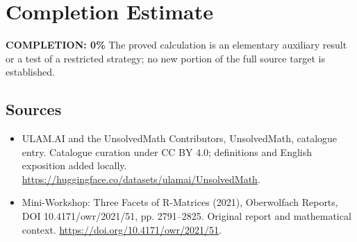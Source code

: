 \documentclass[11pt]{article}
\begin{document}
\section{Completion Estimate}
\noindent\textbf{COMPLETION: 0\%}
The proved calculation is an elementary auxiliary result or a test of a restricted strategy; no new portion of the full source target is established.

\subsection{Sources}
\begin{itemize}
\item[\hypertarget{source:statement:1}{S1}] ULAM.AI and the UnsolvedMath Contributors, UnsolvedMath, catalogue entry. Catalogue curation under CC BY 4.0; definitions and English exposition added locally.
\url{https://huggingface.co/datasets/ulamai/UnsolvedMath}.
\item[\hypertarget{source:statement:2}{S2}] Mini-Workshop: Three Facets of R-Matrices (2021), Oberwolfach Reports, DOI 10.4171/owr/2021/51, pp. 2791--2825. Original report and mathematical context.
\url{https://doi.org/10.4171/owr/2021/51}.
\end{itemize}
\label{end:statement}
\end{document}
